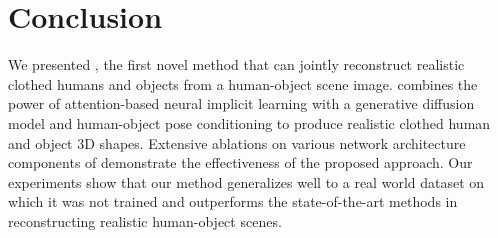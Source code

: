 \vspace{-1mm}
\section{Conclusion}
\label{sec:conclusion}
\vspace{-1mm}
We presented \name, the first novel method that can jointly reconstruct realistic clothed humans and objects from a human-object scene image. \name combines the power of attention-based neural implicit learning with a generative diffusion model and human-object pose conditioning to produce realistic clothed human and object 3D shapes. Extensive ablations on various network architecture components of \name demonstrate the effectiveness of the proposed approach. Our experiments show that our method generalizes well to a real world dataset on which it was not trained and outperforms the state-of-the-art methods in reconstructing realistic human-object scenes.
